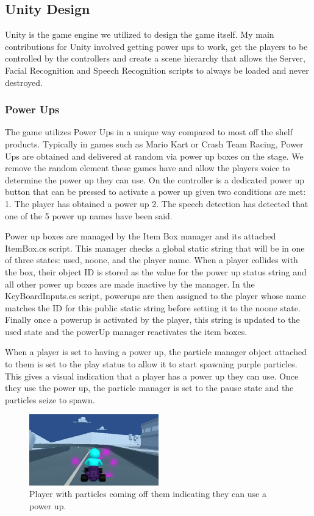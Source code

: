 \documentclass[a4paper,10pt]{article}
\begin{document}
\subsection{Unity Design}
Unity is the game engine we utilized to design the game itself. My main contributions for Unity involved getting power ups to work, get the players to be controlled by the controllers and create a scene hierarchy that allows the Server, Facial Recognition and Speech Recognition scripts to always be loaded and never destroyed.
\subsubsection{Power Ups}
The game utilizes Power Ups in a unique way compared to most off the shelf products. Typically in games such as Mario Kart or Crash Team Racing, Power Ups are obtained and delivered at random via power up boxes on the stage. We remove the random element these games have and allow the players voice to determine the power up they can use. On the controller is a dedicated power up button that can be pressed to activate a power up given two conditions are met: 1. The player has obtained a power up 2. The speech detection has detected that one of the 5 power up names have been said.


Power up boxes are managed by the Item Box manager and its attached ItemBox.cs script. This manager checks a global static string that will be in one of three states: used, noone, and the player name. When a player collides with the box, their object ID is stored as the value for the power up status string and all other power up boxes are made inactive by the manager. In the KeyBoardInputs.cs script, powerups are then assigned to the player whose name matches the ID for this public static string before setting it to the noone state. Finally once a powerup is activated by the player, this string is updated to the used state and the powerUp manager reactivates the item boxes.


When a player is set to having a power up, the particle manager object attached to them is set to the play status to allow it to start spawning purple particles. This gives a visual indication that a player has a power up they can use. Once they use the power up, the particle manager is set to the pause state and the particles seize to spawn.
\begin{figure}[H]
  \centering
      \includegraphics[width=0.5\textwidth]{Assets/Particles.png}
  \caption{Player with particles coming off them indicating they can use a power up.}
\end{figure}
\end{document}
